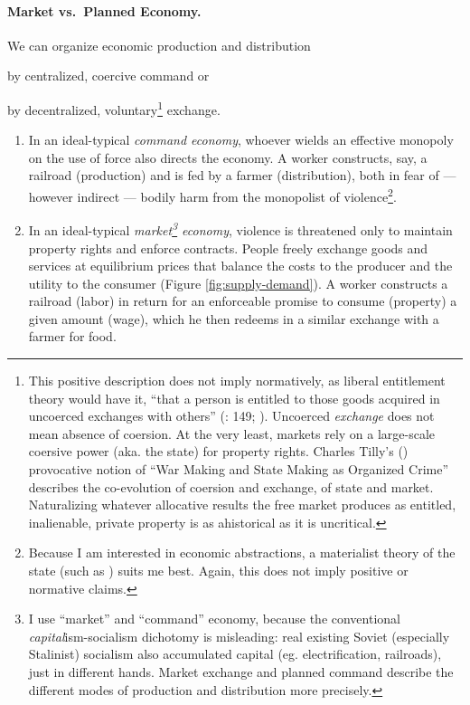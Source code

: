 \paragraph{Market vs.\ Planned Economy.} \label{sec:marketvscommand} We can organize economic production and distribution \begin{inparaenum}[1)]
		\item by centralized, coercive command or
		\item by decentralized, voluntary\footnote{
				\label{fn:tilly}This positive description does not imply normatively, as liberal entitlement theory would have it, ``that a person is entitled to those goods acquired in uncoerced exchanges with others'' (\citealt{Nozick1974}: 149; \citealt{Friedman1962}). Uncoerced \emph{exchange} does not mean absence of coersion. At the very least, markets rely on a large-scale coersive power (aka. the state) for property rights. Charles Tilly's (\citeyear{Tilly-1985-aa}) provocative notion of ``War Making and State Making as Organized Crime'' describes the co-evolution of coersion and exchange, of state and market. Naturalizing whatever allocative results the free market produces as entitled, inalienable, private property is as ahistorical as it is uncritical.}
			exchange. \end{inparaenum}
	\begin{enumerate}
		\item In an ideal-typical \cite{Weber-1920-aa} \emph{command economy}, whoever wields an effective monopoly on the use of force also directs the economy. A worker constructs, say, a railroad (production) and is fed by a farmer (distribution), both in fear of --- however indirect --- bodily harm from the monopolist of violence\footnote{
				Because I am  interested in economic abstractions, a materialist theory of the state (such as \citealt{Tilly-1985-aa}) suits me best. Again, this does not imply positive or normative claims.}.
		\item In an ideal-typical \emph{market\footnote{
				I use ``market'' and ``command'' economy, because the conventional \emph{capital}ism-socialism dichotomy is misleading: real existing Soviet (especially Stalinist) socialism also accumulated capital (eg. electrification, railroads), just in different hands. Market exchange and planned command describe the different modes of production and distribution more precisely.}
			economy}, violence is threatened only to maintain property rights and enforce contracts. People freely exchange goods and services at equilibrium prices that balance the costs to the producer and the utility to the consumer (Figure \ref{fig:supply-demand}).  A worker constructs a railroad (labor) in return for an enforceable promise to consume (property) a given amount (wage), which he then redeems in a similar exchange with a farmer for food.
	\end{enumerate}

